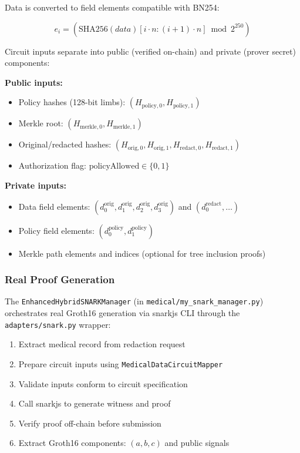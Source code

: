 Data is converted to field elements compatible with BN254:

\begin{equation}
    e_i = \left(\text{SHA256}(data)[i \cdot n : (i+1) \cdot n] \bmod 2^{250}\right)
\end{equation}

Circuit inputs separate into public (verified on-chain) and private (prover secret) components:

\textbf{Public inputs:}
\begin{itemize}
    \item Policy hashes (128-bit limbs): $(H_{\text{policy},0}, H_{\text{policy},1})$
    \item Merkle root: $(H_{\text{merkle},0}, H_{\text{merkle},1})$
    \item Original/redacted hashes: $(H_{\text{orig},0}, H_{\text{orig},1}, H_{\text{redact},0}, H_{\text{redact},1})$
    \item Authorization flag: $\text{policyAllowed} \in \{0, 1\}$
\end{itemize}

\textbf{Private inputs:}
\begin{itemize}
    \item Data field elements: $(d_0^{\text{orig}}, d_1^{\text{orig}}, d_2^{\text{orig}}, d_3^{\text{orig}})$ and $(d_0^{\text{redact}}, \ldots)$
    \item Policy field elements: $(d_0^{\text{policy}}, d_1^{\text{policy}})$
    \item Merkle path elements and indices (optional for tree inclusion proofs)
\end{itemize}

\subsubsection{Real Proof Generation}

The \texttt{EnhancedHybridSNARKManager} (in \texttt{medical/my\_snark\_manager.py}) orchestrates real Groth16 generation via snarkjs CLI through the \texttt{adapters/snark.py} wrapper:

\begin{enumerate}
    \item Extract medical record from redaction request
    \item Prepare circuit inputs using \texttt{MedicalDataCircuitMapper}
    \item Validate inputs conform to circuit specification
    \item Call snarkjs to generate witness and proof
    \item Verify proof off-chain before submission
    \item Extract Groth16 components: $(a, b, c)$ and public signals
\end{enumerate}

